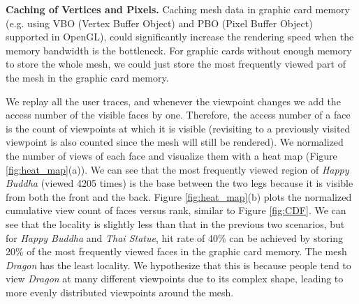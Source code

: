 \textbf{Caching of Vertices and Pixels.}
Caching mesh data in graphic card memory 
(e.g. using VBO (Vertex Buffer Object) and PBO (Pixel Buffer Object) supported in OpenGL), 
could significantly increase the rendering speed when the memory bandwidth is the bottleneck.
For graphic cards without enough memory to store the whole mesh, we could just store the most frequently viewed part of the mesh
in the graphic card memory. 

We replay all the user traces, and whenever the viewpoint changes 
we add the access number of the visible faces by one. 
Therefore, the access number of a face is the count of viewpoints at 
which it is visible (revisiting to a previously visited viewpoint is also counted
since the mesh will still be rendered). 
We normalized the number of views of each face and visualize them with
 a heat map (Figure \ref{fig:heat_map}(a)). 
We can see that the most frequently viewed region of \textit{Happy Buddha} (viewed 4205 times) is 
the base between the two legs because it is visible from both the front and the back.
Figure \ref{fig:heat_map}(b) plots the normalized cumulative view count of faces versus rank, 
similar to Figure \ref{fig:CDF}. We can see that the locality is slightly less than
that in the previous two scenarios, but for \textit{Happy Buddha} and \textit{Thai Statue}, hit rate of 40\%  can be achieved
by storing 20\% of the most frequently viewed faces in the graphic card memory.
The mesh \textit{Dragon} has the least locality. We hypothesize that this is because %
people tend to view \textit{Dragon} at many different viewpoints due to its complex shape,
leading to more evenly distributed viewpoints around the mesh.
    
